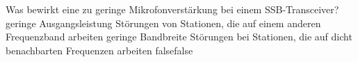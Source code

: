     {Was bewirkt eine zu geringe Mikrofonverstärkung bei einem SSB-Trans\-ceiver?}
    {geringe Ausgangsleistung}
    {Störungen von Stationen, die auf einem anderen Frequenzband arbeiten}
    {geringe Bandbreite}
    {Störungen bei Stationen, die auf dicht benachbarten Frequenzen arbeiten}
    {false}{false}